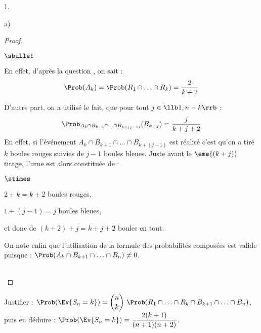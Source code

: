 \documentclass[11pt]{article}%
\begin{document}
\begin{noliste}{1.}
\begin{noliste}{a)}
\begin{proof}
\begin{noliste}{$\sbullet$}
      \item En effet, d'après la question , on sait : 
        \[
        \Prob(A_k) = \Prob(R_1 \cap \ldots \cap R_{k}) = \dfrac{2}{k+2}
        \]

      \item D'autre part, on a utilisé le fait, que pour tout $j \in
        \llb 1, n-k \rrb$ :
        \[
        \Prob_{A_k \cap B_{k+1} \cap \ldots \cap B_{k+(j-1)}}(B_{k+j})
        = \dfrac{j}{k+j+2}
        \]
        En effet, si l'événement $A_k \cap B_{k+1} \cap \ldots \cap
        B_{k+(j-1)}$ est réalisé c'est qu'on a tiré $k$
        boules rouges suivies de $j-1$ boules bleues. Juste avant le
        $\eme{(k+j)}$ tirage, l'urne est alors constituée de :
        \begin{noliste}{$\stimes$}
        \item $2 + k = k+2$ boules rouges,
        \item $1 + (j-1) = j$ boules bleues,
        \item et donc de $(k+2) + j = k + j + 2$ boules en tout.
        \end{noliste}

      \item On note enfin que l'utilisation de la formule des
        probabilités composées est valide puisque : $\Prob(A_k \cap
        B_{k+1} \cap \ldots \cap B_{n}) \neq 0$.
      \end{noliste}
      ~\\[-1.4cm]
    \end{proof}




  \item Justifier : $\Prob(\Ev{S_n = k}) = \dbinom{n}{k} \ \Prob(R_1
    \cap \ldots \cap R_k \cap B_{k+1} \cap \ldots \cap B_n)$,\\
    puis en déduire : $\Prob(\Ev{S_n = k}) =
    \dfrac{2(k+1)}{(n+1)(n+2)}$.


\end{noliste}
\end{noliste}
\end{document}
